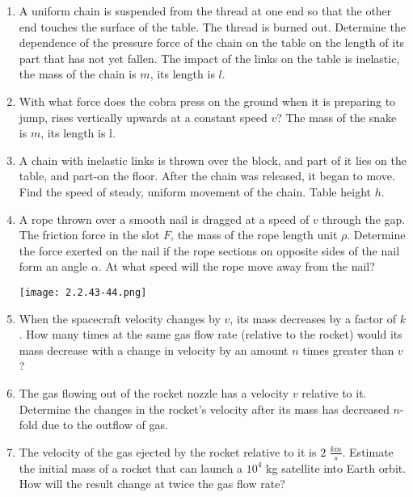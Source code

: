 \documentclass{article}
\begin{document}
\begin{enumerate}[label=2.2.\arabic*]
\item A uniform chain is suspended from the thread at one end so that the other end touches the surface of the table. The thread is burned out. Determine the dependence of the pressure force of the chain on the table on the length of its part that has not yet fallen. The impact of the links on the table is inelastic, the mass of the chain is $m$, its length is $l$.

\item With what force does the cobra press on the ground when it is preparing to jump, rises vertically upwards at a constant speed $v$? The mass of the snake is $m$, its length is l.

\item A chain with inelastic links is thrown over the block, and part of it lies on the table, and part-on the floor. After the chain was released, it began to move. Find the speed of steady, uniform movement of the chain. Table height $h$.

\item A rope thrown over a smooth nail is dragged at a speed of $v$ through the gap. The friction force in the slot $F$, the mass of the rope length unit $\rho$. Determine the force exerted on the nail if the rope sections on opposite sides of the nail form an angle $\alpha$. At what speed will the rope move away from the nail?

\begin{center}
    \texttt{[image: 2.2.43-44.png]}
\end{center}

\item When the spacecraft velocity changes by $v$, its mass decreases by a factor of $k$. How many times at the same gas flow rate (relative to the rocket) would its mass decrease with a change in velocity by an amount $n$ times greater than $v$?

\item The gas flowing out of the rocket nozzle has a velocity $v$ relative to it. Determine the changes in the rocket's velocity after its mass has decreased $n$-fold due to the outflow of gas.

\item The velocity of the gas ejected by the rocket relative to it is $2$ $\frac{km}{s}$. Estimate the initial mass of a rocket that can launch a $10^4$ kg satellite into Earth orbit. How will the result change at twice the gas flow rate?




\end{enumerate}
\end{document}
